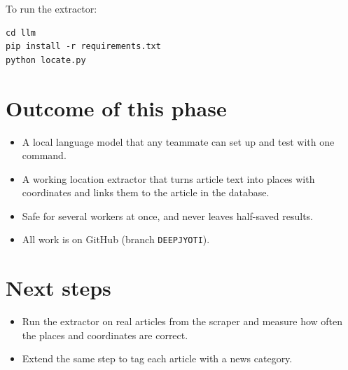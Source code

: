 \documentclass[11pt,a4paper]{article}
\begin{document}
To run the extractor:

\begin{verbatim}
cd llm
pip install -r requirements.txt
python locate.py
\end{verbatim}

\section{Outcome of this phase}

\begin{itemize}
  \item A local language model that any teammate can set up and test with one command.
  \item A working location extractor that turns article text into places with coordinates and links them to the article in the database.
  \item Safe for several workers at once, and never leaves half-saved results.
  \item All work is on GitHub (branch \texttt{DEEPJYOTI}).
\end{itemize}

\section{Next steps}

\begin{itemize}
  \item Run the extractor on real articles from the scraper and measure how often the places and coordinates are correct.
  \item Extend the same step to tag each article with a news category.
\end{itemize}
\end{document}
